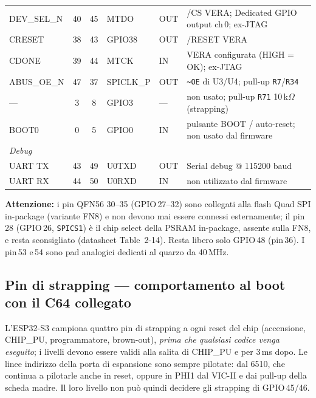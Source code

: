 \documentclass[12pt, a4paper]{article}
\begin{document}
\begin{center}
{\begin{tabular}{lcclll}
DEV\_SEL\_N & 40 & 45 & MTDO   & OUT & /CS VERA; Dedicated GPIO output ch\,0; ex-JTAG \\
CRESET      & 38 & 43 & GPIO38 & OUT & /RESET VERA \\
CDONE       & 39 & 44 & MTCK   & IN  & VERA configurata (HIGH = OK); ex-JTAG \\
ABUS\_OE\_N & 47 & 37 & SPICLK\_P & OUT & \texttt{\textasciitilde OE} di U3/U4; pull-up \texttt{R7}/\texttt{R34} \\
--- & 3 & 8 & GPIO3 & --- & non usato; pull-up \texttt{R71} 10\,k$\Omega$ (strapping) \\
BOOT0 & 0 & 5 & GPIO0 & IN & pulsante BOOT / auto-reset; non usato dal firmware \\
\midrule
\multicolumn{6}{l}{\textit{Debug}} \\
UART TX & 43 & 49 & U0TXD & OUT & Serial debug @ 115200 baud \\
UART RX & 44 & 50 & U0RXD & IN  & non utilizzato dal firmware \\
\bottomrule
\end{tabular}%
}
\end{center}

\noindent\textbf{Attenzione:} i pin QFN56 30--35 (GPIO\,27--32) sono collegati alla flash Quad SPI in-package (variante FN8) e non devono mai essere connessi esternamente; il pin\,28 (GPIO\,26, \texttt{SPICS1}) è il chip select della PSRAM in-package, assente sulla FN8, e resta sconsigliato (datasheet Table~2-14). Resta libero solo GPIO\,48 (pin\,36). I pin\,53 e\,54 sono pad analogici dedicati al quarzo da 40\,MHz.

\subsection{Pin di strapping --- comportamento al boot con il C64 collegato}
\label{sec:strapping}

L'ESP32-S3 campiona quattro pin di strapping a ogni reset del chip (accensione, CHIP\_PU, programmatore, brown-out), \emph{prima che qualsiasi codice venga eseguito}; i livelli devono essere validi alla salita di CHIP\_PU e per 3\,ms dopo. Le linee indirizzo della porta di espansione sono sempre pilotate: dal 6510, che continua a pilotarle anche in reset, oppure in PHI1 dal VIC-II e dai pull-up della scheda madre. Il loro livello non può quindi decidere gli strapping di GPIO\,45/46.
\end{document}

